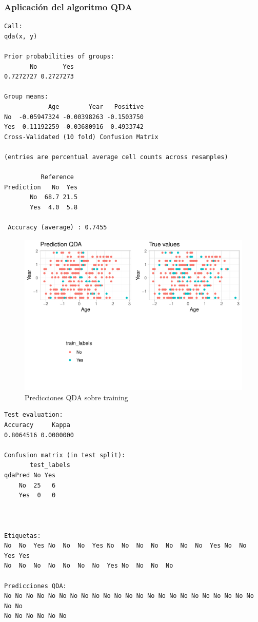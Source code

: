 \subsubsection{Aplicación del algoritmo QDA}

\begin{verbatim}
Call:
qda(x, y)

Prior probabilities of groups:
       No       Yes 
0.7272727 0.2727273 

Group means:
            Age        Year   Positive
No  -0.05947324 -0.00398263 -0.1503750
Yes  0.11192259 -0.03680916  0.4933742
Cross-Validated (10 fold) Confusion Matrix 

(entries are percentual average cell counts across resamples)
 
          Reference
Prediction   No  Yes
       No  68.7 21.5
       Yes  4.0  5.8
                            
 Accuracy (average) : 0.7455
\end{verbatim}

\begin{figure}[H]\center\includegraphics[width=.78\linewidth]{img/Clasificacion_files/figure-latex/unnamed-chunk-30-1}\caption{Predicciones QDA sobre training}\end{figure}

\vspace{\baselineskip}

\begin{verbatim}
Test evaluation:
Accuracy     Kappa 
0.8064516 0.0000000

Confusion matrix (in test split):
       test_labels
qdaPred No Yes
    No  25   6
    Yes  0   0



Etiquetas:
No  No  Yes No  No  No  Yes No  No  No  No  No  No  No  Yes No  No  Yes Yes
No  No  No  No  No  No  No  Yes No  No  No  No 

Predicciones QDA:
No No No No No No No No No No No No No No No No No No No No No No No No No
No No No No No No
\end{verbatim}

